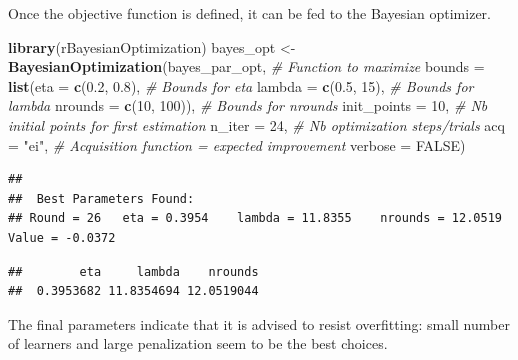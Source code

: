 \documentclass[]{krantz}
\makeatletter
\newenvironment{Shaded}{\begin{snugshade}}{\end{snugshade}}
\newcommand{\CommentTok}[1]{\textcolor[rgb]{0.37,0.37,0.37}{\textit{#1}}}
\newcommand{\DataTypeTok}[1]{\textcolor[rgb]{0.27,0.27,0.27}{#1}}
\newcommand{\DecValTok}[1]{\textcolor[rgb]{0.06,0.06,0.06}{#1}}
\newcommand{\FloatTok}[1]{\textcolor[rgb]{0.06,0.06,0.06}{#1}}
\newcommand{\KeywordTok}[1]{\textcolor[rgb]{0.27,0.27,0.27}{\textbf{#1}}}
\newcommand{\NormalTok}[1]{#1}
\newcommand{\OperatorTok}[1]{\textcolor[rgb]{0.43,0.43,0.43}{\textbf{#1}}}
\newcommand{\OtherTok}[1]{\textcolor[rgb]{0.37,0.37,0.37}{#1}}
\newcommand{\StringTok}[1]{\textcolor[rgb]{0.5,0.5,0.5}{#1}}
\newenvironment{kframe}{%
\medskip{}
\setlength{\fboxsep}{.8em}
 \def\at@end@of@kframe{}%
 \ifinner\ifhmode%
  \def\at@end@of@kframe{\end{minipage}}%
  \begin{minipage}{\columnwidth}%
 \fi\fi%
 \def\FrameCommand##1{\hskip\@totalleftmargin \hskip-\fboxsep
 \colorbox{shadecolor}{##1}\hskip-\fboxsep
     \hskip-\linewidth \hskip-\@totalleftmargin \hskip\columnwidth}%
 \MakeFramed {\advance\hsize-\width
   \@totalleftmargin\z@ \linewidth\hsize
   \@setminipage}}%
 {\par\unskip\endMakeFramed%
 \at@end@of@kframe}
\renewenvironment{Shaded}{\begin{kframe}}{\end{kframe}}
\theoremstyle{definition}
\theoremstyle{definition}
\theoremstyle{definition}
\theoremstyle{remark}
\makeatother
\begin{document}
Once the objective function is defined, it can be fed to the Bayesian
optimizer.

\footnotesize

\begin{Shaded}
\begin{Highlighting}[]
\KeywordTok{library}\NormalTok{(rBayesianOptimization)}
\NormalTok{bayes_opt <-}\StringTok{ }\KeywordTok{BayesianOptimization}\NormalTok{(bayes_par_opt,           }\CommentTok{# Function to maximize}
                     \DataTypeTok{bounds =} \KeywordTok{list}\NormalTok{(}\DataTypeTok{eta =} \KeywordTok{c}\NormalTok{(}\FloatTok{0.2}\NormalTok{, }\FloatTok{0.8}\NormalTok{),      }\CommentTok{# Bounds for eta}
                                   \DataTypeTok{lambda =} \KeywordTok{c}\NormalTok{(}\FloatTok{0.5}\NormalTok{, }\DecValTok{15}\NormalTok{),    }\CommentTok{# Bounds for lambda}
                                   \DataTypeTok{nrounds =} \KeywordTok{c}\NormalTok{(}\DecValTok{10}\NormalTok{, }\DecValTok{100}\NormalTok{)),  }\CommentTok{# Bounds for nrounds}
                     \DataTypeTok{init_points =} \DecValTok{10}\NormalTok{,            }\CommentTok{# Nb initial points for first estimation}
                     \DataTypeTok{n_iter =} \DecValTok{24}\NormalTok{,                 }\CommentTok{# Nb optimization steps/trials}
                     \DataTypeTok{acq =} \StringTok{"ei"}\NormalTok{,                  }\CommentTok{# Acquisition function = expected improvement}
                     \DataTypeTok{verbose =} \OtherTok{FALSE}\NormalTok{)}
\end{Highlighting}
\end{Shaded}

\begin{verbatim}
## 
##  Best Parameters Found: 
## Round = 26   eta = 0.3954    lambda = 11.8355    nrounds = 12.0519   Value = -0.0372
\end{verbatim}

\begin{Shaded}
\end{Shaded}

\begin{verbatim}
##        eta     lambda    nrounds 
##  0.3953682 11.8354694 12.0519044
\end{verbatim}

\normalsize

The final parameters indicate that it is advised to resist overfitting:
small number of learners and large penalization seem to be the best
choices.
\end{document}
